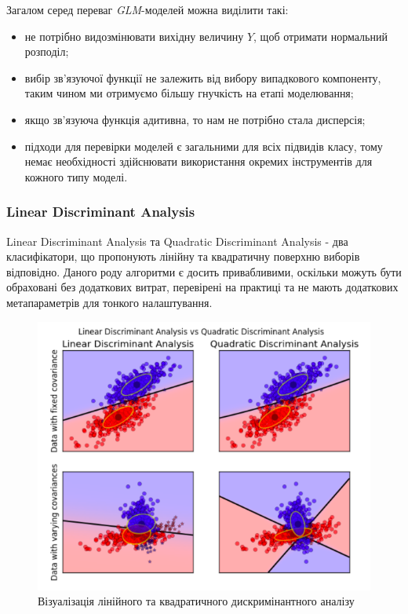 Загалом серед переваг \textit{GLM}-моделей можна виділити такі:
\begin{itemize}  
	\item не потрібно видозмінювати вихідну величину $Y$, щоб отримати нормальний розподіл;
	\item вибір зв'язуючої функції не залежить від вибору випадкового компоненту, таким чином ми отримуємо більшу гнучкість на етапі моделювання;
	\item якщо зв'язуюча функція адитивна, то нам не потрібно стала дисперсія;
	\item підходи для перевірки моделей є загальними для всіх підвидів класу, тому немає необхідності здійснювати використання окремих інструментів для кожного типу моделі.
\end{itemize}

\subsubsection{Linear Discriminant Analysis}
Linear Discriminant Analysis та Quadratic Discriminant Analysis - два класифікатори, що пропонують лінійну та квадратичну поверхню виборів відповідно. Даного роду алгоритми є досить привабливими, оскільки можуть бути обраховані без додаткових витрат, перевірені на практиці та не мають додаткових метапараметрів для тонкого налаштування.

\begin{figure}[h!]
  \includegraphics[width=\linewidth]{figures/lda_qda.png}
  \caption{Візуалізація лінійного та квадратичного дискримінантного аналізу}
  \label{fig:lda_qda}
\end{figure}

